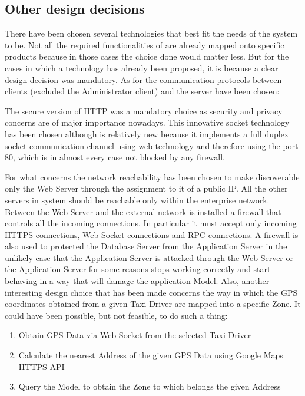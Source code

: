 \subsection{Other design decisions}
There have been chosen several technologies that best fit the needs of the system to be. Not all the required functionalities of \myTaxiService{} are already mapped onto specific products because in those cases the choice done would matter less.
But for the cases in which a technology has already been proposed, it is because a clear design decision was mandatory.
As for the communication protocols between clients (excluded the Administrator client) and the server have been chosen:
\begin{itemize}
	 The secure version of HTTP was a mandatory choice as security and privacy concerns are of major importance nowadays.
	 This innovative socket technology has been chosen although is relatively new because it implements a full duplex socket communication channel using web technology and therefore using the port 80, which is in almost every case not blocked by any firewall.
\end{itemize}
For what concerns the network reachability has been chosen to make discoverable only the Web Server through the assignment to it of a public IP.
All the other servers in \myTaxiService{} system should be reachable only within the enterprise network.
Between the Web Server and the external network is installed a firewall that controls all the incoming connections.
In particular it must accept only incoming HTTPS connections, Web Socket connections and RPC connections.
A firewall is also used to protected the Database Server from the Application Server in the unlikely case that the Application Server is attacked through the Web Server or the Application Server for some reasons stops working correctly and start behaving in a way that will damage the application Model.
Also, another interesting design choice that has been made concerns the way in which the GPS coordinates obtained from a given Taxi Driver are mapped into a specific Zone.
It could have been possible, but not feasible, to do such a thing:
\begin{enumerate}
	\item Obtain GPS Data via Web Socket from the selected Taxi Driver
	\item Calculate the nearest Address of the given GPS Data using Google Maps HTTPS API
	\item Query the Model to obtain the Zone to which belongs the given Address
\end{enumerate}
